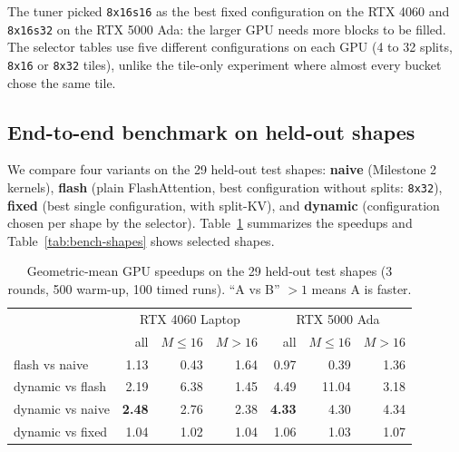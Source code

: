\documentclass[11pt]{article}
\begin{document}
The tuner picked \texttt{8x16s16} as the best fixed configuration on the RTX 4060
and \texttt{8x16s32} on the RTX 5000 Ada: the larger GPU needs more blocks to be
filled. The selector tables use five different configurations on each GPU
(4 to 32 splits, \texttt{8x16} or \texttt{8x32} tiles), unlike the tile-only
experiment where almost every bucket chose the same tile.

\subsection{End-to-end benchmark on held-out shapes}
\label{sec:bench}
We compare four variants on the 29 held-out test shapes:
\textbf{naive} (Milestone 2 kernels),
\textbf{flash} (plain FlashAttention, best configuration without splits: \texttt{8x32}),
\textbf{fixed} (best single configuration, with split-KV), and
\textbf{dynamic} (configuration chosen per shape by the selector).
Table~\ref{tab:bench-summary} summarizes the speedups and
Table~\ref{tab:bench-shapes} shows selected shapes.

\begin{table}[H]
\centering
\caption{Geometric-mean GPU speedups on the 29 held-out test shapes
(3 rounds, 500 warm-up, 100 timed runs). ``A vs B'' $>1$ means A is faster.}
\label{tab:bench-summary}
\begin{tabular}{lrrr@{\hskip 2em}rrr}
\toprule
 & \multicolumn{3}{c}{RTX 4060 Laptop} & \multicolumn{3}{c}{RTX 5000 Ada} \\
 & all & $M \le 16$ & $M > 16$ & all & $M \le 16$ & $M > 16$ \\
\midrule
flash vs naive   & 1.13 & 0.43 & 1.64 & 0.97 & 0.39 & 1.36 \\
dynamic vs flash & 2.19 & 6.38 & 1.45 & 4.49 & 11.04 & 3.18 \\
dynamic vs naive & \textbf{2.48} & 2.76 & 2.38 & \textbf{4.33} & 4.30 & 4.34 \\
dynamic vs fixed & 1.04 & 1.02 & 1.04 & 1.06 & 1.03 & 1.07 \\
\bottomrule
\end{tabular}
\end{table}
\end{document}
